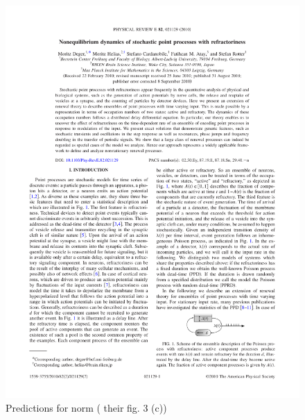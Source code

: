 \begin{figure}[h]
	\centering
	\includegraphics*[page=4,viewport=308 567 441 617]{images/Deger2010.pdf} %
	\caption{Predictions for norm (\cite{Deger}  their fig. 3 (c))}
	\label{fig:prednorm}
\end{figure}

